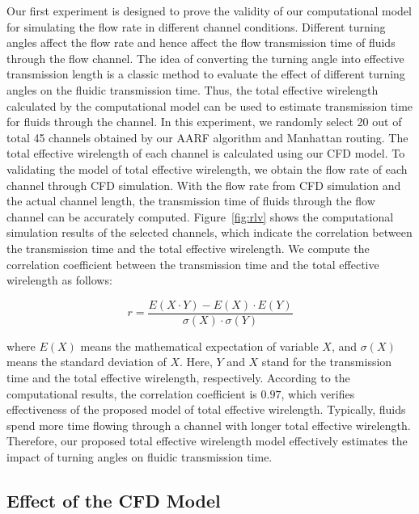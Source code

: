 \documentclass[journal]{IEEEtran}
\begin{document}
Our first experiment is designed to prove the validity of our computational model for simulating the flow rate in different channel conditions. 
Different turning angles affect the flow rate and hence affect the flow transmission time of fluids through the flow channel. 
The idea of converting the turning angle into effective transmission length is a classic method to evaluate the effect of different turning angles on the fluidic transmission time. 
Thus, the total effective wirelength calculated by the computational model can be used to estimate transmission time for fluids through the channel. 
In this experiment, we randomly select 20 out of total 45 channels obtained by our AARF algorithm and Manhattan routing. 
The total effective wirelength of each channel is calculated using our CFD model.
To validating the model of total effective wirelength, we obtain the flow rate of each channel through CFD simulation. 
With the flow rate from CFD simulation and the actual channel length, the transmission time of fluids through the flow channel can be accurately computed.
Figure~\ref{fig:rlv} shows the computational simulation results of the selected channels, which indicate the correlation between the transmission time and the total effective wirelength. We compute the correlation coefficient between the transmission time and the total effective wirelength as follows:

\begin{equation}
r = \frac{E(X \cdot Y) - E(X) \cdot E(Y)}{\sigma(X) \cdot \sigma(Y)}
\end{equation}

\noindent where $E(X)$ means the mathematical expectation of variable $X$, and $\sigma(X)$ means the standard deviation of $X$. Here, $Y$ and $X$ stand for the transmission time and the total effective wirelength, respectively. According to the computational results, the correlation coefficient is $0.97$, which verifies effectiveness of the proposed model of total effective wirelength. 
Typically, fluids spend more time flowing through a channel with longer total effective wirelength. 
Therefore, our proposed total effective wirelength model effectively estimates the impact of turning angles on fluidic transmission time.

\subsection{Effect of the CFD Model}
\end{document}
